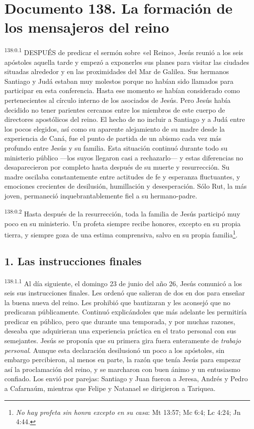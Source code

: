 \chapter{Documento 138. La formación de los mensajeros del reino}
\par
\textsuperscript{138:0.1} DESPUÉS de predicar el sermón sobre «el Reino», Jesús reunió a los seis apóstoles aquella tarde y empezó a exponerles sus planes para visitar las ciudades situadas alrededor y en las proximidades del Mar de Galilea. Sus hermanos Santiago y Judá estaban muy molestos porque no habían sido llamados para participar en esta conferencia. Hasta ese momento se habían considerado como pertenecientes al círculo interno de los asociados de Jesús. Pero Jesús había decidido no tener parientes cercanos entre los miembros de este cuerpo de directores apostólicos del reino. El hecho de no incluir a Santiago y a Judá entre los pocos elegidos, así como su aparente alejamiento de su madre desde la experiencia de Caná, fue el punto de partida de un abismo cada vez más profundo entre Jesús y su familia. Esta situación continuó durante todo su ministerio público ---los suyos llegaron casi a rechazarlo--- y estas diferencias no desaparecieron por completo hasta después de su muerte y resurrección. Su madre oscilaba constantemente entre actitudes de fe y esperanza fluctuantes, y emociones crecientes de desilusión, humillación y desesperación. Sólo Rut, la más joven, permaneció inquebrantablemente fiel a su hermano-padre.

\par
\textsuperscript{138:0.2} Hasta después de la resurrección, toda la familia de Jesús participó muy poco en su ministerio. Un profeta siempre recibe honores, excepto en su propia tierra, y siempre goza de una estima comprensiva, salvo en su propia familia\footnote{\textit{No hay profeta sin honra excepto en su casa}: Mt 13:57; Mc 6:4; Lc 4:24; Jn 4:44.}.

\section*{1. Las instrucciones finales}
\par
\textsuperscript{138:1.1} Al día siguiente, el domingo 23 de junio del año 26, Jesús comunicó a los seis sus instrucciones finales. Les ordenó que salieran de dos en dos para enseñar la buena nueva del reino. Les prohibió que bautizaran y les aconsejó que no predicaran públicamente. Continuó explicándoles que más adelante les permitiría predicar en público, pero que durante una temporada, y por muchas razones, deseaba que adquirieran una experiencia práctica en el trato personal con sus semejantes. Jesús se proponía que su primera gira fuera enteramente de \textit{trabajo personal}. Aunque esta declaración desilusionó un poco a los apóstoles, sin embargo percibieron, al menos en parte, la razón que tenía Jesús para empezar así la proclamación del reino, y se marcharon con buen ánimo y un entusiasmo confiado. Los envió por parejas: Santiago y Juan fueron a Jeresa, Andrés y Pedro a Cafarnaúm, mientras que Felipe y Natanael se dirigieron a Tariquea.

